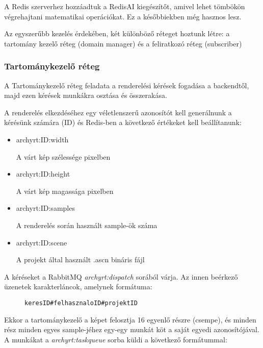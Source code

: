 A Redis szerverhez hozzáadtuk a RedisAI kiegészítőt, amivel lehet tömbökön végrehajtani matematikai operációkat. Ez a későbbiekben még hasznos lesz.

Az egyszerűbb kezelés érdekében, két különböző réteget hoztunk létre: a tartomány kezelő réteg (domain manager) és a feliratkozó réteg (subscriber)

\subsubsection{Tartománykezelő réteg}
A Tartománykezelő réteg feladata a renderelési kérések fogadása a backendtől, majd ezen kérések munkákra osztása és összerakása.

A renderelés elkezdéséhez egy véletlenszerű azonosítót kell generálnunk a kérésünk számára (ID) és Redis-ben a következő értékeket kell beállítanunk:

\begin{itemize}
    \item archyrt:ID:width

          A várt kép szélessége pixelben
    \item archyrt:ID:height

          A várt kép magassága pixelben
    \item archyrt:ID:samples

          A renderelés során használt sample-ök száma
    \item archyrt:ID:scene

          A projekt által használt .ascn bináris fájl
\end{itemize}

A kéréseket a RabbitMQ \emph{archyrt:dispatch} sorából várja. Az innen beérkező üzenetek karakterláncok, amelynek formátuma:

\begin{figure}[h]
    \centering
    \begin{minipage}{.7\textwidth}
        \begin{lstlisting}
keresID#felhasznaloID#projektID
\end{lstlisting}
    \end{minipage}
\end{figure}

Ekkor a tartománykezelő a képet felosztja 16 egyenlő részre (csempe), és minden rész minden egyes sample-jéhez egy-egy munkát köt a saját egyedi azonosítójával. A munkákat a \emph{archyrt:taskqueue} sorba küldi a következő formátummal:

